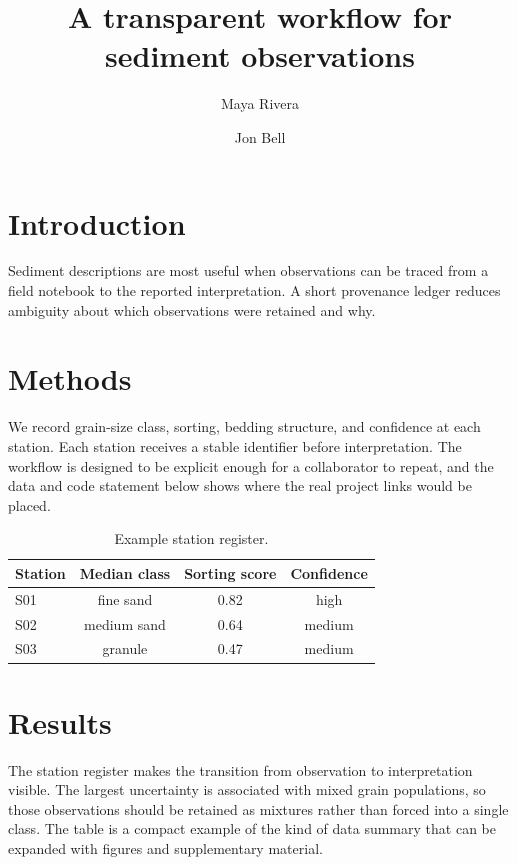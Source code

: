 \documentclass[preprint]{sedimentologika}
\title{A transparent workflow for sediment observations}
\author[1]{Maya Rivera}
\author[1]{Jon Bell}
\affil[1]{Northbridge Earth Systems Lab, Example University}
\begin{document}

\section{Introduction}
Sediment descriptions are most useful when observations can be traced from a
field notebook to the reported interpretation.  A short provenance ledger
reduces ambiguity about which observations were retained and why.

\section{Methods}
We record grain-size class, sorting, bedding structure, and confidence at each
station.  Each station receives a stable identifier before interpretation.
The workflow is designed to be explicit enough for a collaborator to repeat,
and the data and code statement below shows where the real project links would
be placed.

\begin{table}[ht]
  \centering
  \caption{Example station register.}
  \label{tab:stations}
  \begin{tabular}{lccc}
    \toprule
    Station & Median class & Sorting score & Confidence \\
    \midrule
    S01 & fine sand & 0.82 & high \\
    S02 & medium sand & 0.64 & medium \\
    S03 & granule & 0.47 & medium \\
    \bottomrule
  \end{tabular}
\end{table}

\section{Results}
The station register makes the transition from observation to interpretation
visible.  The largest uncertainty is associated with mixed grain populations,
so those observations should be retained as mixtures rather than forced into
a single class.  The table is a compact example of the kind of data summary
that can be expanded with figures and supplementary material.
\end{document}

